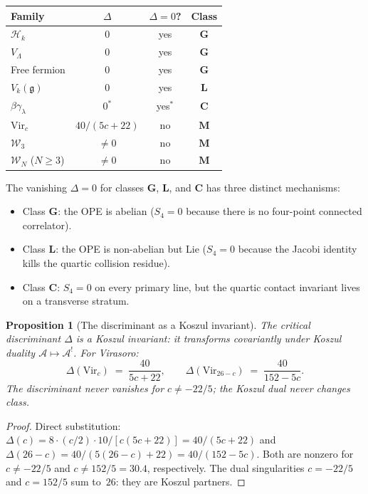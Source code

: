 \documentclass[11pt,reqno]{amsart}
\newtheorem{proposition}[theorem]{Proposition}
\theoremstyle{definition}
\theoremstyle{remark}
\newcommand{\cA}{\mathcal{A}}
\newcommand{\cH}{\mathcal{H}}
\newcommand{\cW}{\mathcal{W}}
\newcommand{\fg}{\mathfrak{g}}
\newcommand{\Vir}{\mathrm{Vir}}
\numberwithin{equation}{section}
\begin{document}
\begin{center}
\renewcommand{\arraystretch}{1.3}
\begin{tabular}{lccc}
\toprule
Family & $\Delta$ & $\Delta = 0$? & Class \\
\midrule
$\cH_k$ & $0$ & yes & $\mathbf{G}$ \\
$V_\Lambda$ & $0$ & yes & $\mathbf{G}$ \\
Free fermion & $0$ & yes & $\mathbf{G}$ \\
$V_k(\fg)$ & $0$ & yes & $\mathbf{L}$ \\
$\beta\gamma_\lambda$ & $0^*$ & yes$^*$ & $\mathbf{C}$ \\
\addlinespace
$\Vir_c$ & $40/(5c+22)$ & no & $\mathbf{M}$ \\
$\cW_3$ & $\ne 0$ & no & $\mathbf{M}$ \\
$\cW_N$ ($N \ge 3$) & $\ne 0$ & no & $\mathbf{M}$ \\
\bottomrule
\end{tabular}
\end{center}

\noindent The vanishing $\Delta = 0$ for classes
$\mathbf{G}$, $\mathbf{L}$, and $\mathbf{C}$ has three
distinct mechanisms:
\begin{itemize}
\item Class $\mathbf{G}$: the OPE is abelian ($S_4 = 0$
 because there is no four-point connected correlator).
\item Class $\mathbf{L}$: the OPE is non-abelian but Lie
 ($S_4 = 0$ because the Jacobi identity kills the quartic
 collision residue).
\item Class $\mathbf{C}$: $S_4 = 0$ on every primary
 line, but the quartic contact invariant lives on a
 transverse stratum.
\end{itemize}

\begin{proposition}[The discriminant as a Koszul
invariant]\label{prop:disc-invariant}
The critical discriminant $\Delta$ is a Koszul invariant:
it transforms covariantly under Koszul duality
$\cA \mapsto \cA^!$. For Virasoro:
\[
 \Delta(\Vir_c)
 \;=\;
 \frac{40}{5c+22},
 \qquad
 \Delta(\Vir_{26-c})
 \;=\;
 \frac{40}{152-5c}.
\]
The discriminant never vanishes for $c \ne -22/5$; the
Koszul dual never changes class.
\end{proposition}

\begin{proof}
Direct substitution: $\Delta(c) = 8 \cdot (c/2) \cdot
10/[c(5c+22)] = 40/(5c+22)$ and
$\Delta(26-c) = 40/(5(26-c)+22) = 40/(152-5c)$. Both are
nonzero for $c \ne -22/5$ and $c \ne 152/5 = 30.4$,
respectively. The dual singularities $c = -22/5$ and
$c = 152/5$ sum to~$26$: they are Koszul partners.
\end{proof}
\end{document}
